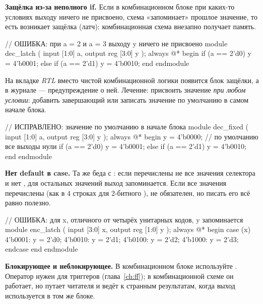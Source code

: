 \textbf{Защёлка из-за неполного if.} Если в комбинационном блоке при
каких-то условиях выходу ничего не присвоено, схема «запоминает» прошлое
значение, то есть возникает защёлка (латч): комбинационная схема внезапно
получает память.

\begin{vcode}
// ОШИБКА: при a = 2 и a = 3 выходу y ничего не присвоено
module dec_latch (
    input      [1:0] a,
    output reg [3:0] y
);
    always @* begin
        if (a == 2'd0)      y = 4'b0001;
        else if (a == 2'd1) y = 4'b0010;
    end
endmodule
\end{vcode}

На вкладке \emph{RTL} вместо чистой комбинационной логики появится блок
защёлки, а в журнале --- предупреждение о ней. Лечение: присвоить значение
\emph{при любом условии}: добавить завершающий  или записать
значение по умолчанию в самом начале блока.

\begin{vcode}
// ИСПРАВЛЕНО: значение по умолчанию в начале блока
module dec_fixed (
    input      [1:0] a,
    output reg [3:0] y
);
    always @* begin
        y = 4'b0000;                       // по умолчанию все выходы нули
        if (a == 2'd0)      y = 4'b0001;
        else if (a == 2'd1) y = 4'b0010;
    end
endmodule
\end{vcode}

\textbf{Нет default в case.} Та же беда с : если перечислены не
все значения селектора и нет , для остальных значений выход
запоминается. Если все значения перечислены (как в $4$ строках для $2$-битного
),  не обязателен, но писать его всё равно полезно.

\begin{vcode}
// ОШИБКА: для x, отличного от четырёх унитарных кодов, y запоминается
module enc_latch (
    input      [3:0] x,
    output reg [1:0] y
);
    always @* begin
        case (x)
            4'b0001: y = 2'd0;
            4'b0010: y = 2'd1;
            4'b0100: y = 2'd2;
            4'b1000: y = 2'd3;
        endcase
    end
endmodule
\end{vcode}

\textbf{Блокирующее и неблокирующее.} В комбинационном блоке
 используйте \code{=}. Оператор \code{<=} нужен для
триггеров (глава~\ref{ch:ff}); в комбинационной схеме он работает, но
путает читателя и ведёт к странным результатам, когда выход используется
в том же блоке.


